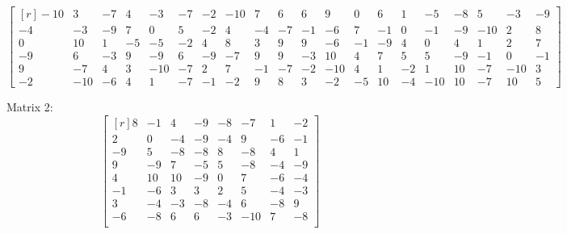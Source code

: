 \documentclass[a4paper]{article}
\begin{document}
$$\begin{bmatrix}[r]
				-10 & 3 & -7 & 4 & -3 & -7 & -2 & -10 & 7 & 6 & 6 & 9 & 0 & 6 & 1 & -5 & -8 & 5 & -3 & -9 \\
				-4 & -3 & -9 & 7 & 0 & 5 & -2 & 4 & -4 & -7 & -1 & -6 & 7 & -1 & 0 & -1 & -9 & -10 & 2 & 8 \\
				0 & 10 & 1 & -5 & -5 & -2 & 4 & 8 & 3 & 9 & 9 & -6 & -1 & -9 & 4 & 0 & 4 & 1 & 2 & 7 \\
				-9 & 6 & -3 & 9 & -9 & 6 & -9 & -7 & 9 & 9 & -3 & 10 & 4 & 7 & 5 & 5 & -9 & -1 & 0 & -1 \\
				9 & -7 & 4 & 3 & -10 & -7 & 2 & 7 & -1 & -7 & -2 & -10 & 4 & 1 & -2 & 1 & 10 & -7 & -10 & 3 \\
				-2 & -10 & -6 & 4 & 1 & -7 & -1 & -2 & 9 & 8 & 3 & -2 & -5 & 10 & -4 & -10 & 10 & -7 & 10 & 5 \
			\end{bmatrix}$$
			
			Matrix 2:
			$$\begin{bmatrix}[r]
				8 & -1 & 4 & -9 & -8 & -7 & 1 & -2 \\
				2 & 0 & -4 & -9 & -4 & 9 & -6 & -1 \\
				-9 & 5 & -8 & -8 & 8 & -8 & 4 & 1 \\
				9 & -9 & 7 & -5 & 5 & -8 & -4 & -9 \\
				4 & 10 & 10 & -9 & 0 & 7 & -6 & -4 \\
				-1 & -6 & 3 & 3 & 2 & 5 & -4 & -3 \\
				3 & -4 & -3 & -8 & -4 & 6 & -8 & 9 \\
				-6 & -8 & 6 & 6 & -3 & -10 & 7 & -8 \\
			\end{bmatrix}$$
			
\end{document}
